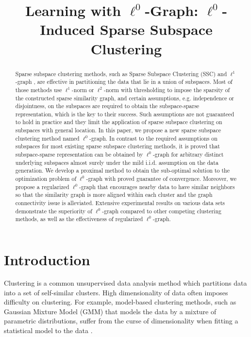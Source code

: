 \documentclass[10pt,twocolumn,letterpaper]{article}
\begin{document}
\title{Learning with $\ell^{0}$-Graph: $\ell^{0}$-Induced Sparse Subspace Clustering}

\author{}

\maketitle

\begin{abstract}
Sparse subspace clustering methods, such as Sparse Subspace Clustering (SSC) \cite{ElhamifarV13} and $\ell^{1}$-graph \cite{YanW09,ChengYYFH10}, are effective in partitioning the data that lie in a union of subspaces. Most of those methods use $\ell^{1}$-norm or $\ell^{2}$-norm with thresholding to impose the sparsity of the constructed sparse similarity graph, and certain assumptions, e.g. independence or disjointness, on the subspaces are required to obtain the subspace-sparse representation, which is the key to their success. Such assumptions are not guaranteed to hold in practice and they limit the application of sparse subspace clustering on subspaces with general location. In this paper, we propose a new sparse subspace clustering method named $\ell^{0}$-graph. In contrast to the required assumptions on subspaces for most existing sparse subspace clustering methods, it is proved that subspace-sparse representation can be obtained by $\ell^{0}$-graph for arbitrary distinct underlying subspaces almost surely under the mild i.i.d. assumption on the data generation. We develop a proximal method to obtain the sub-optimal solution to the optimization problem of $\ell^{0}$-graph with proved guarantee of convergence. Moreover, we propose a regularized $\ell^{0}$-graph that encourages nearby data to have similar neighbors so that the similarity graph is more aligned within each cluster and the graph connectivity issue is alleviated. Extensive experimental results on various data sets demonstrate the superiority of $\ell^{0}$-graph compared to other competing clustering methods, as well as the effectiveness of regularized $\ell^{0}$-graph.
\end{abstract}
\section{Introduction}
Clustering is a common unsupervised data analysis method which partitions data into a set of self-similar clusters. High dimensionality of data often imposes difficulty on clustering. For example, model-based clustering methods, such as Gaussian Mixture Model (GMM) that models the data by a mixture of parametric distributions, suffer from the curse of dimensionality when fitting a statistical model to the data \cite{Fraley02}.
\end{document}
